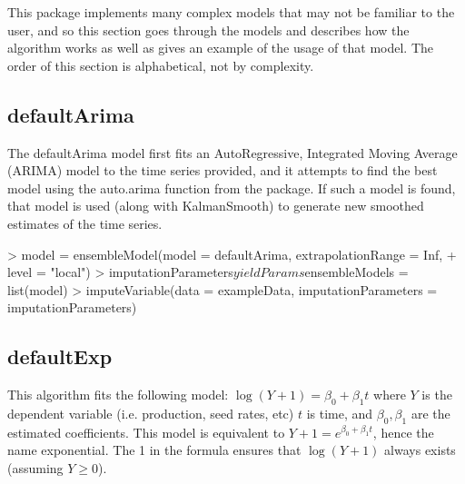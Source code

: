 \documentclass[nojss]{jss}
\begin{document}
This package implements many complex models that may not be familiar to the
user, and so this section goes through the models and describes
how the algorithm works as well as gives an example of the usage of that model.
The order of this section is alphabetical, not by complexity. 
\subsection{defaultArima}

The defaultArima model first fits an AutoRegressive, Integrated Moving Average
(ARIMA) model to the time series provided, and it attempts to find the best
model using the auto.arima function from the  package.  If such a
model is found, that model is used (along with KalmanSmooth) to generate
new smoothed estimates of the time series.

\begin{Schunk}
\begin{Sinput}
> model = ensembleModel(model = defaultArima, extrapolationRange = Inf,
+                       level = "local")
> imputationParameters$yieldParams$ensembleModels = list(model)
> imputeVariable(data = exampleData, imputationParameters = imputationParameters)
\end{Sinput}
\end{Schunk}


\subsection{defaultExp}

This algorithm fits the following model: $\log(Y+1) = \beta_0 + \beta_1 t$
where $Y$ is the dependent variable (i.e. production, seed rates, etc) $t$
is time, and $\beta_0, \beta_1$ are the estimated coefficients.  This model is
equivalent to $Y + 1 = e^{\beta_0 + \beta_1 t}$, hence the name exponential.
The 1 in the formula ensures that $\log(Y+1)$ always exists (assuming
$Y \geq 0$).
\end{document}
